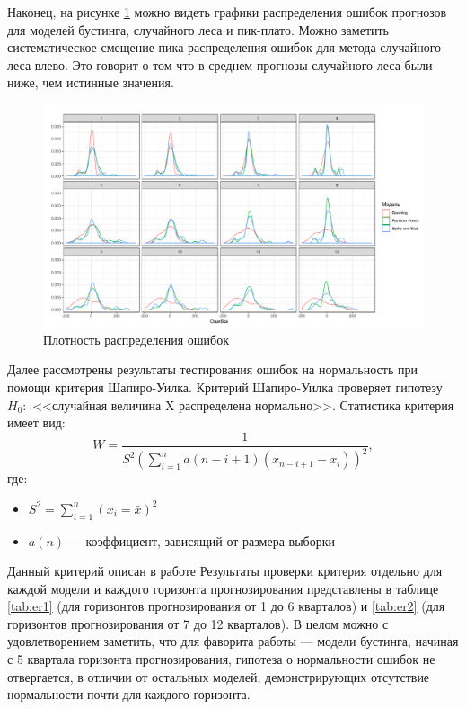 Наконец, на рисунке \ref{fig:error3} можно видеть графики распределения ошибок прогнозов для моделей бустинга, случайного леса и пик-плато. Можно заметить систематическое смещение пика распределения ошибок для метода случайного леса влево. Это говорит о том что в среднем прогнозы случайного леса были ниже, чем истинные значения.
\begin{figure}[h]
    \centering
    \includegraphics[width = \textwidth]{error3.pdf}
    \caption{Плотность распределения ошибок}
    \label{fig:error3}
\end{figure}

Далее рассмотрены результаты тестирования ошибок на нормальность при помощи критерия Шапиро-Уилка. Критерий Шапиро-Уилка проверяет гипотезу $H_0:$ <<случайная величина X распределена нормально>>. Статистика критерия имеет вид:
\begin{equation}
    W = \frac{1}{S^2\left(\sum_{i=1}^n a(n-i+1) (x_{n-i+1} - x_i)\right)^2},
\end{equation}
где:

\begin{itemize}
    \item $S^2 = \sum_{i=1}^{n} \left(x_i = \bar{x}\right)^2$
    \item $a(n)$ --- коэффициент, зависящий от размера выборки
\end{itemize}
Данный критерий описан в работе \cite{shapiro1965analysis}
Результаты проверки критерия отдельно для каждой модели и каждого горизонта прогнозирования представлены в таблице \ref{tab:er1} (для горизонтов прогнозирования от 1 до 6 кварталов) и \ref{tab:er2} (для горизонтов прогнозирования от 7 до 12 кварталов). В целом можно с удовлетворением заметить, что для фаворита работы --- модели бустинга, начиная с 5 квартала горизонта прогнозирования, гипотеза о нормальности ошибок не отвергается, в отличии от остальных моделей, демонстрирующих отсутствие нормальности почти для каждого горизонта.

